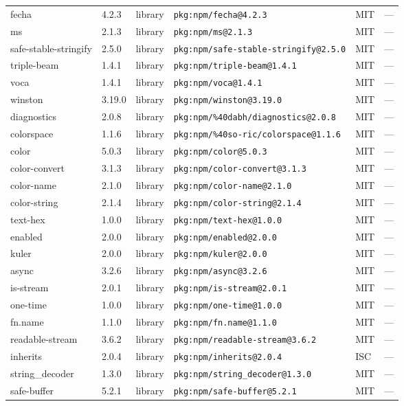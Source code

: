 \documentclass[11pt]{article}
\begin{document}
\begin{longtable}{|l|l|l|p{2.2cm}|l|p{4cm}|}
fecha & 4.2.3 & library & \texttt{pkg:npm/fecha@4.2.3} & MIT & — \\
ms & 2.1.3 & library & \texttt{pkg:npm/ms@2.1.3} & MIT & — \\
safe-stable-stringify & 2.5.0 & library & \texttt{pkg:npm/safe-stable-stringify@2.5.0} & MIT & — \\
triple-beam & 1.4.1 & library & \texttt{pkg:npm/triple-beam@1.4.1} & MIT & — \\
voca & 1.4.1 & library & \texttt{pkg:npm/voca@1.4.1} & MIT & — \\
winston & 3.19.0 & library & \texttt{pkg:npm/winston@3.19.0} & MIT & — \\
diagnostics & 2.0.8 & library & \texttt{pkg:npm/\%40dabh/diagnostics@2.0.8} & MIT & — \\
colorspace & 1.1.6 & library & \texttt{pkg:npm/\%40so-ric/colorspace@1.1.6} & MIT & — \\
color & 5.0.3 & library & \texttt{pkg:npm/color@5.0.3} & MIT & — \\
color-convert & 3.1.3 & library & \texttt{pkg:npm/color-convert@3.1.3} & MIT & — \\
color-name & 2.1.0 & library & \texttt{pkg:npm/color-name@2.1.0} & MIT & — \\
color-string & 2.1.4 & library & \texttt{pkg:npm/color-string@2.1.4} & MIT & — \\
text-hex & 1.0.0 & library & \texttt{pkg:npm/text-hex@1.0.0} & MIT & — \\
enabled & 2.0.0 & library & \texttt{pkg:npm/enabled@2.0.0} & MIT & — \\
kuler & 2.0.0 & library & \texttt{pkg:npm/kuler@2.0.0} & MIT & — \\
async & 3.2.6 & library & \texttt{pkg:npm/async@3.2.6} & MIT & — \\
is-stream & 2.0.1 & library & \texttt{pkg:npm/is-stream@2.0.1} & MIT & — \\
one-time & 1.0.0 & library & \texttt{pkg:npm/one-time@1.0.0} & MIT & — \\
fn.name & 1.1.0 & library & \texttt{pkg:npm/fn.name@1.1.0} & MIT & — \\
readable-stream & 3.6.2 & library & \texttt{pkg:npm/readable-stream@3.6.2} & MIT & — \\
inherits & 2.0.4 & library & \texttt{pkg:npm/inherits@2.0.4} & ISC & — \\
string\_decoder & 1.3.0 & library & \texttt{pkg:npm/string\_decoder@1.3.0} & MIT & — \\
safe-buffer & 5.2.1 & library & \texttt{pkg:npm/safe-buffer@5.2.1} & MIT & — \\

\end{longtable}
\end{document}
